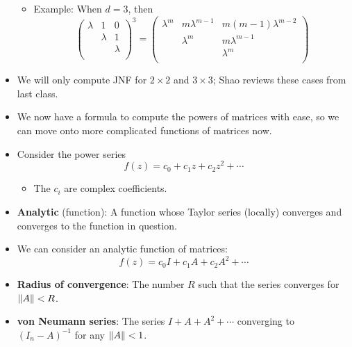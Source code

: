 \documentclass[../notes.tex]{subfiles}
\begin{document}
\begin{itemize}
\begin{itemize}
\begin{equation*}
        \end{equation*}
        \item Example: When $d=3$, then
        \begin{equation*}
            \begin{pmatrix}
                \lambda & 1 & 0\\
                 & \lambda & 1\\
                 &  & \lambda\\
            \end{pmatrix}^3
            =
            \begin{pmatrix}
                \lambda^m & m\lambda^{m-1} & m(m-1)\lambda^{m-2}\\
                 & \lambda^m & m\lambda^{m-1}\\
                 &  & \lambda^m\\
            \end{pmatrix}
        \end{equation*}
    \end{itemize}
    \item We will only compute JNF for $2\times 2$ and $3\times 3$; Shao reviews these cases from last class.
    \item We now have a formula to compute the powers of matrices with ease, so we can move onto more complicated functions of matrices now.
    \item Consider the power series
    \begin{equation*}
        f(z) = c_0+c_1z+c_2z^2+\cdots
    \end{equation*}
    \begin{itemize}
        \item The $c_i$ are complex coefficients.
    \end{itemize}
    \item \textbf{Analytic} (function): A function whose Taylor series (locally) converges and converges to the function in question.
    \item We can consider an analytic function of matrices:
    \begin{equation*}
        f(z) = c_0I+c_1A+c_2A^2+\cdots
    \end{equation*}
    \item \textbf{Radius of convergence}: The number $R$ such that the series converges for $\norm{A}<R$.
    \item \textbf{von Neumann series}: The series $I+A+A^2+\cdots$ converging to $(I_n-A)^{-1}$ for any $\norm{A}<1$.

\end{itemize}
\end{document}
